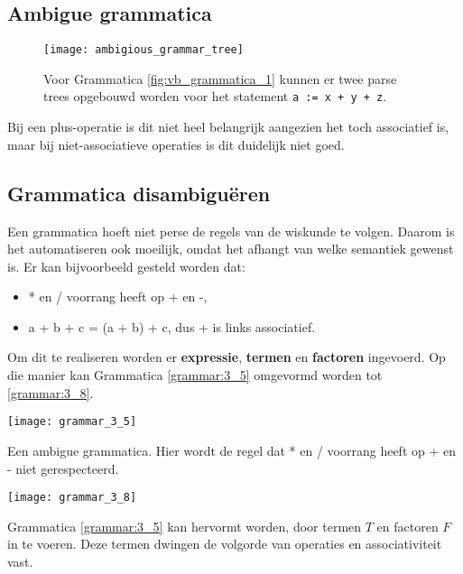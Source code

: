 \subsection{Ambigue grammatica}

\begin{figure}
	\texttt{[image: ambigious\_grammar\_tree]}
	\caption{Voor Grammatica \ref{fig:vb_grammatica_1} kunnen er twee parse trees opgebouwd worden voor het statement \texttt{a := x + y + z}.} 
	\label{fig:ambigious_grammar_tree}
\end{figure}

Bij een plus-operatie is dit niet heel belangrijk aangezien het toch associatief is, maar bij niet-associatieve operaties is dit duidelijk niet goed.

\subsection{Grammatica disambiguëren}
Een grammatica hoeft niet perse de regels van de wiskunde te volgen. Daarom is het automatiseren ook moeilijk, omdat het afhangt van welke semantiek gewenst is. Er kan bijvoorbeeld gesteld worden dat:
\begin{itemize}
	\item * en / voorrang heeft op + en -,
	\item a + b + c = (a + b) + c, dus + is links associatief.
\end{itemize}
Om dit te realiseren worden er \textbf{expressie}, \textbf{termen} en \textbf{factoren} ingevoerd. Op die manier kan Grammatica \ref{grammar:3_5} omgevormd worden tot \ref{grammar:3_8}.

\begin{grammarfigure}
	\centering
	\texttt{[image: grammar\_3\_5]}
	\caption{Een ambigue grammatica. Hier wordt de regel dat * en / voorrang heeft op + en - niet gerespecteerd. }
	\label{grammar:3_5}
\end{grammarfigure}
\begin{grammarfigure}
	\centering
	\texttt{[image: grammar\_3\_8]}
	\caption{Grammatica \ref{grammar:3_5} kan hervormt worden, door termen $T$ en factoren $F$ in te voeren. Deze termen dwingen de volgorde van operaties en associativiteit vast.}
	\label{grammar:3_8}
\end{grammarfigure}


